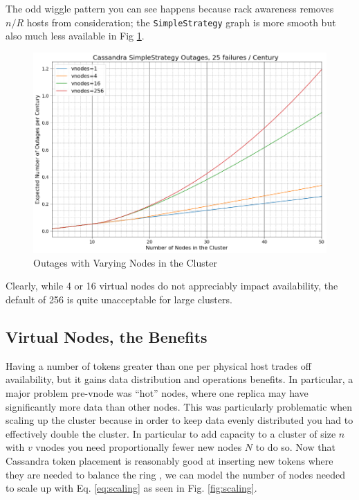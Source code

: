 \documentclass{article}
\begin{document}
The odd wiggle pattern you can see happens because rack awareness removes $n/R$
hosts from consideration; the \texttt{SimpleStrategy} graph is more smooth but also
much less available in Fig \ref{fig:outages_nodes_small_simple}.

\begin{figure}[H]
    \centering
    \includegraphics[width=1.0\textwidth]{images/outages_nodes_small_simple.png}
    \caption{Outages with Varying Nodes in the Cluster}
    \label{fig:outages_nodes_small_simple}
\end{figure}

Clearly, while 4 or 16 virtual nodes do not appreciably impact availability,
the default of 256 is quite unacceptable for large clusters.

\subsection{Virtual Nodes, the Benefits}

Having a number of tokens greater than one per physical host trades off
availability, but it gains data distribution and operations benefits. In
particular, a major problem pre-vnode was ``hot'' nodes, where one replica
may have significantly more data than other nodes. This was particularly
problematic when scaling up the cluster because in order to keep data evenly
distributed you had to effectively double the cluster. In particular to add
capacity to a cluster of size $n$ with $v$ vnodes you need proportionally fewer
new nodes $N$ to do so. Now that Cassandra token placement is reasonably good
at inserting new tokens where they are needed to balance the ring
\cite{tokenallocation}, we can model the number of nodes needed to scale up
with Eq. \ref{eq:scaling} as seen in Fig. \ref{fig:scaling}.
\end{document}
